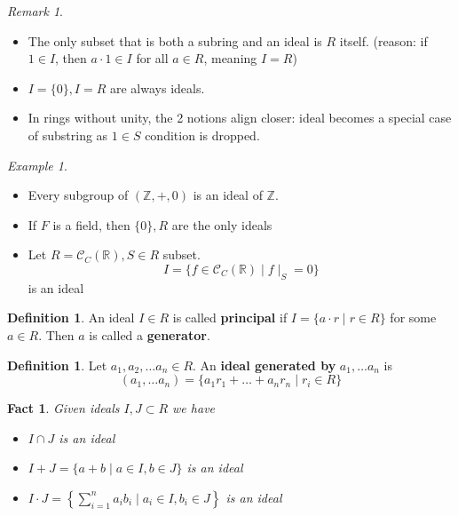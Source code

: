 \documentclass{amsart}
\newcommand{\RR}{\mathbb{R}}
\newcommand{\ZZ}{\mathbb{Z}}
\newtheorem{fact}[thm]{Fact}
\theoremstyle{definition}
\newtheorem{defn}[thm]{Definition}
\theoremstyle{remark}
\newtheorem*{rmk}{Remark}
\newtheorem*{ex}{Example}
\begin{document}
\begin{rmk}\hspace{0.5cm}
    \begin{itemize}
        \item The only subset that is both a subring and an ideal is $R$ itself.
        (reason: if $1 \in I$, then $a \cdot 1 \in I$ for all $a \in R$, meaning $I = R$)
        \item $I = \{0\}, I = R$ are always ideals.
        \item In rings without unity, the 2 notions align closer: ideal becomes a special
        case of substring as $1 \in S$ condition is dropped.
    \end{itemize}
\end{rmk}
\begin{ex} \hspace{0.5cm}
    \begin{itemize}
        \item Every subgroup of $(\ZZ, +, 0)$ is an ideal of $\ZZ$.
        \item If $F$ is a field, then $\{0\}, R$ are the only ideals
        \item Let $R = \mathcal{C}_C(\RR), S \in R$ subset.
        $$
        I = \{f \in \mathcal{C}_C(\RR) \mid f \mid_{S} = 0 \}
        $$
        is an ideal
    \end{itemize}
\end{ex}
\begin{defn}
    An ideal $I \in R$ is called \textbf{principal} if $I = \{a \cdot r \mid r \in R\}$
    for some $a \in R$. Then $a$ is called a \textbf{generator}.
\end{defn}
\begin{defn}
    Let $a_1, a_2, \dots a_n \in R$. An \textbf{ideal generated by} $a_1, \dots a_n$ is
    $$
    (a_1, \dots a_n) = \{a_1r_1 + \dots + a_nr_n \mid r_i \in R\}
    $$
\end{defn}
\begin{fact}
    Given ideals $I, J \subset R$ we have
    \begin{itemize}
        \item $I \cap J$ is an ideal
        \item $I + J = \{a + b \mid a \in I, b \in J \}$ is an ideal
        \item $I \cdot J = \left\{\sum\limits_{i = 1}^{n}a_ib_i \mid a_i \in I, b_i \in J \right\}$ is an ideal
    \end{itemize}
\end{fact}
\end{document}
